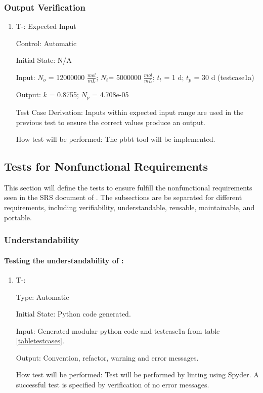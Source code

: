\documentclass[12pt, titlepage]{article}
\newcounter{tinnum} %
\begin{document}
\subsubsection{Output Verification}\label{TO-1-1}

\begin{enumerate}

\item{T-}\thetinnum\label{T-8}: Expected Input

Control: Automatic
					
Initial State: N/A
					
Input: $N_{o}$ = 12000000 $\frac{mol}{mL}$; $N_{t}$= 5000000 $\frac{mol}{mL}$; 
$t_{t}$ = 1 d; $t_{p}$ = 30 d (testcase1a)
					
Output: $k$ = 0.8755; $N_p$ = 4.708e-05

Test Case Derivation: Inputs within expected input range are used in the 
previous test to ensure the correct values produce an output.
					
How test will be performed: The pbbt tool will be implemented.


\end{enumerate}


\subsection{Tests for Nonfunctional Requirements} \label{tnfr}
  
This section will define the tests to ensure \progname{} fulfill the 
nonfunctional requirements seen in the SRS document of \progname{}. The 
subsections are be separated for different requirements, including 
verifiability, understandable, reusable, maintainable, and portable.


\subsubsection{Understandability} \label{nonfunc_understability}

\paragraph{Testing the understandability of \progname{}:}
\begin{enumerate}

\item{T-}\thetinnum\label{T-9}:

Type: Automatic
					
Initial State: Python code generated.
					
Input: Generated modular python code and testcase1a from table \ref{tabletestcases}.
					
Output: Convention, refactor, warning and error messages.
					
How test will be performed: Test will be performed by linting using Spyder. A successful test is specified by verification of no error messages.
				

\end{enumerate}
\end{document}
